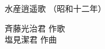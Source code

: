 \documentclass[10pt,b5j]{tarticle} %
\begin{document}
\begin{minipage}[c]{0.7\hsize} %
    \begin{center}
        {\LARGE
            水産逍遥歌 %
        }
        {\small 
            （昭和十二年） %
        }
    \end{center}
\end{minipage}
\begin{minipage}[c]{0.3\hsize} %
    \begin{flushright} %
        斉藤光治君 作歌\\塩見潔君 作曲 %
    \end{flushright}
\end{minipage}
\end{document}
